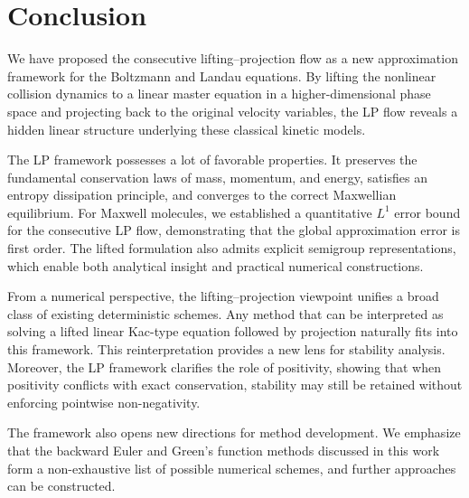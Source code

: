 \documentclass{article}
\numberwithin{equation}{section}
\begin{document}
\section{Conclusion}\label{sec:conclusion}
We have proposed the consecutive lifting–projection flow as a new approximation framework for the Boltzmann and Landau equations. By lifting the nonlinear collision dynamics to a linear master equation in a higher-dimensional phase space and projecting back to the original velocity variables, the LP flow reveals a hidden linear structure underlying these classical kinetic models.

The LP framework possesses a lot of favorable properties. It preserves the fundamental conservation laws of mass, momentum, and energy, satisfies an entropy dissipation principle, and converges to the correct Maxwellian equilibrium. For Maxwell molecules, we established a quantitative $L^1$ error bound for the consecutive LP flow, demonstrating that the global approximation error is first order. The lifted formulation also admits explicit semigroup representations, which enable both analytical insight and practical numerical constructions.

From a numerical perspective, the lifting–projection viewpoint unifies a broad class of existing deterministic schemes. Any method that can be interpreted as solving a lifted linear Kac-type equation followed by projection naturally fits into this framework. This reinterpretation provides a new lens for stability analysis. Moreover, the LP framework clarifies the role of positivity, showing that when positivity conflicts with exact conservation, stability may still be retained without enforcing pointwise non-negativity.

The framework also opens new directions for method development. We emphasize that the backward Euler and Green’s function methods discussed in this work form a non-exhaustive list of possible numerical schemes, and further approaches can be constructed.




\end{document}
